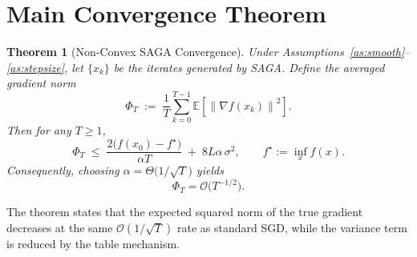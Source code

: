 \documentclass{article}
\newtheorem{theorem}{Theorem}
\newcommand{\EE}{\mathbb{E}}
\newcommand{\norm}[1]{\left\|#1\right\|}
\begin{document}
\section*{Main Convergence Theorem}
\begin{theorem}[Non‑Convex SAGA Convergence]\label{thm:main}
Under Assumptions~\ref{as:smooth}–\ref{as:stepsize},
let $\{x_k\}$ be the iterates generated by SAGA.
Define the averaged gradient norm
\[
\Phi_T \;:=\; \frac{1}{T}\sum_{k=0}^{T-1}
\EE\!\left[\norm{\nabla f(x_k)}^{2}\right].
\]
Then for any $T\ge 1$,
\[
\Phi_T \;\le\;
\frac{2\bigl(f(x_0)-f^\star\bigr)}{\alpha T}
\;+\; 8L\alpha\,\sigma^{2},
\qquad
f^\star:=\inf_{x}f(x).
\tag{4}
\]
Consequently, choosing $\alpha=\Theta\!\bigl(1/\sqrt{T}\bigr)$ yields
\[
\Phi_T =\mathcal{O}\!\bigl(T^{-1/2}\bigr).
\]
\end{theorem}
The theorem states that the expected squared norm of the true gradient
decreases at the same $\mathcal{O}(1/\sqrt{T})$ rate as standard SGD,
while the variance term is reduced by the table mechanism.

\end{document}
